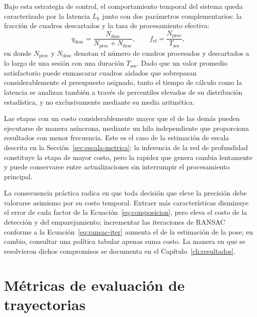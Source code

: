 Bajo esta estrategia de control, el comportamiento temporal del sistema queda caracterizado por la latencia $L_k$ junto con dos parámetros complementarios: la fracción de cuadros descartados y la tasa de procesamiento efectiva:
\begin{equation}
q_{\mathrm{desc}} = \frac{N_{\mathrm{desc}}}{N_{\mathrm{proc}} + N_{\mathrm{desc}}},
\qquad
f_{\mathrm{ef}} = \frac{N_{\mathrm{proc}}}{T_{\mathrm{ses}}},
\label{eq:descarte}
\end{equation}
en donde $N_{\mathrm{proc}}$ y $N_{\mathrm{desc}}$ denotan el número de cuadros procesados y descartados a lo largo de una sesión con una duración $T_{\mathrm{ses}}$.
Dado que un valor promedio satisfactorio puede enmascarar cuadros aislados que sobrepasan considerablemente el presupuesto asignado, tanto el tiempo de cálculo como la latencia se analizan también a través de percentiles elevados de su distribución estadística, y no exclusivamente mediante su media aritmética.

Las etapas con un costo considerablemente mayor que el de las demás pueden ejecutarse de manera asíncrona, mediante un hilo independiente que proporciona resultados con menor frecuencia.
Este es el caso de la estimación de escala descrita en la Sección~\ref{sec:escala-metrica}: la inferencia de la red de profundidad constituye la etapa de mayor costo, pero la rapidez que genera cambia lentamente y puede conservarse entre actualizaciones sin interrumpir el procesamiento principal.

La consecuencia práctica radica en que toda decisión que eleve la precisión debe valorarse asimismo por su costo temporal.
Extraer más características disminuye el error de cada factor de la Ecuación~\eqref{eq:composicion}, pero eleva el costo de la detección y del emparejamiento; incrementar las iteraciones de RANSAC conforme a la Ecuación~\eqref{eq:ransac-iter} aumenta el de la estimación de la pose; en cambio, consultar una política tabular apenas suma costo.
La manera en que se resolvieron dichos compromisos se documenta en el Capítulo~\ref{ch:resultados}.

\section{Métricas de evaluación de trayectorias}
\label{sec:metricas}

